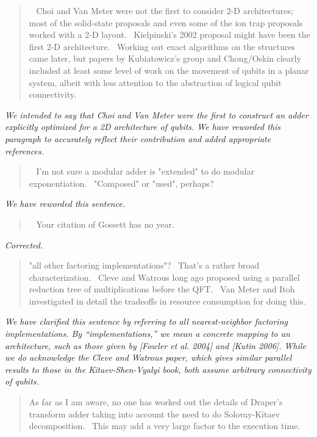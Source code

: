 \documentclass{article}
\theoremstyle{plain} \newtheorem{lemma}{Lemma}
\begin{document}
\begin{quote}
  Choi and Van Meter were not the first to consider 2-D architectures;
most of the solid-state proposals and even some of the ion trap
proposals worked with a 2-D layout.  Kielpinski's 2002 proposal might
have been the first 2-D architecture.  Working out exact algorithms on
the structures came later, but papers by Kubiatowicz's group and
Chong/Oskin clearly included at least some level of work on the
movement of qubits in a planar system, albeit with less attention to
the abstraction of logical qubit connectivity.
\end{quote}

{\it 
We intended to say that Choi and Van Meter were the first to construct an adder explicitly optimized for a 2D architecture of qubits.
We have reworded this paragraph to accurately reflect their contribution and added appropriate references.}

\begin{quote}
  I'm not sure a modular adder is "extended" to do modular
exponentiation.  "Composed" or "used", perhaps?
\end{quote}

{\it We have reworded this sentence.}

\begin{quote}
  Your citation of Gossett has no year.
\end{quote}

{\it Corrected.}

\begin{quote}
"all other factoring implementations"?  That's a rather broad
characterization.  Cleve and Watrous long ago proposed using a
parallel reduction tree of multiplications before the QFT.  Van Meter
and Itoh investigated in detail the tradeoffs in resource consumption
for doing this.
\end{quote}

{\it We have clarified this sentence by referring to all nearest-neighbor factoring
implementations. By ``implementations,'' we mean a concrete mapping to an
architecture, such as those given by [Fowler et al. 2004] and [Kutin 2006].
While we do acknowledge the Cleve and Watrous paper, which gives
similar parallel results to those in the Kitaev-Shen-Vyalyi book, both
assume arbitrary connectivity of qubits.}

\begin{quote}
As far as I am aware, no one has worked out the details of Draper's
transform adder taking into account the need to do Solovay-Kitaev
decomposition.  This may add a very large factor to the execution
time.
\end{quote}
\end{document}
